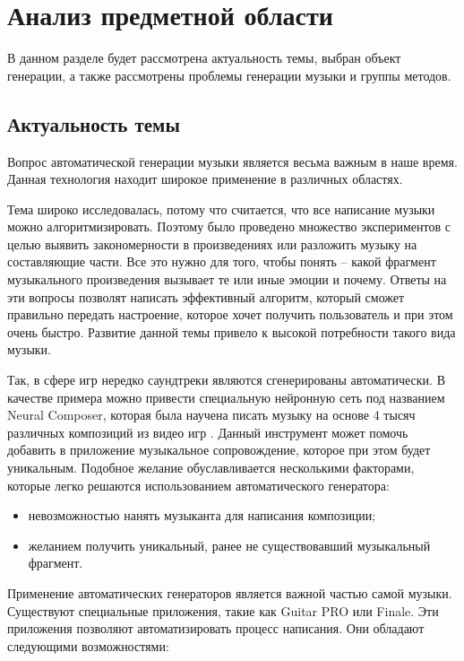 \chapter{Анализ предметной области}

В данном разделе будет рассмотрена актуальность темы, выбран объект генерации, а также рассмотрены проблемы генерации музыки и группы методов.

\section{Актуальность темы}

Вопрос автоматической генерации музыки является весьма важным в наше время. Данная технология находит широкое применение в различных областях.

Тема широко исследовалась, потому что считается, что все написание музыки можно алгоритмизировать. Поэтому было проведено множество экспериментов \cite{music-mood} с целью выявить закономерности в произведениях или разложить музыку на составляющие части. Все это нужно для того, чтобы понять -- какой фрагмент музыкального произведения вызывает те или иные эмоции и почему. Ответы на эти вопросы позволят написать эффективный алгоритм, который сможет правильно передать настроение, которое хочет получить пользователь и при этом очень быстро. Развитие данной темы привело к высокой потребности такого вида музыки.

Так, в сфере игр нередко саундтреки являются сгенерированы автоматически. В качестве примера можно привести специальную нейронную сеть под названием Neural Composer, которая была научена писать музыку на основе 4 тысяч различных композиций из видео игр \cite{neural-composer}. Данный инструмент может помочь добавить в приложение музыкальное сопровождение, которое при этом будет уникальным. Подобное желание обуславливается несколькими факторами, которые легко решаются использованием автоматического генератора:

\begin{itemize}
    \item невозможностью нанять музыканта для написания композиции;
    \item желанием получить уникальный, ранее не существовавший музыкальный фрагмент.
\end{itemize}

Применение автоматических генераторов является важной частью самой музыки. Существуют специальные приложения, такие как Guitar PRO или Finale. Эти приложения позволяют автоматизировать процесс написания. Они обладают следующими возможностями:

